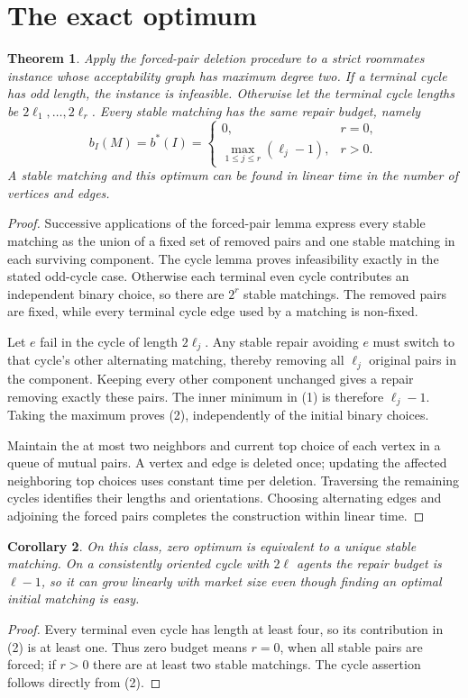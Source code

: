 \documentclass[11pt]{article}
\newtheorem{theorem}{Theorem}
\newtheorem{corollary}[theorem]{Corollary}
\theoremstyle{definition}
\begin{document}
\section*{The exact optimum}
\begin{theorem}
Apply the forced-pair deletion procedure to a strict roommates instance
whose acceptability graph has maximum degree two. If a terminal cycle
has odd length, the instance is infeasible. Otherwise let the terminal
cycle lengths be $2\ell_1,\ldots,2\ell_r$. Every stable matching has
the same repair budget, namely
\[
 b_I(M)=b^*(I)=
 \begin{cases}
 0,&r=0,\\
 \max_{1\le j\le r}(\ell_j-1),&r>0.
 \end{cases}                                               \tag{2}
\]
A stable matching and this optimum can be found in linear time in the
number of vertices and edges.
\end{theorem}
\begin{proof}
Successive applications of the forced-pair lemma express every stable
matching as the union of a fixed set of removed pairs and one stable
matching in each surviving component. The cycle lemma proves infeasibility
exactly in the stated odd-cycle case. Otherwise each terminal even cycle
contributes an independent binary choice, so there are $2^r$ stable
matchings. The removed pairs are fixed, while every terminal cycle edge
used by a matching is non-fixed.

Let $e$ fail in the cycle of length $2\ell_j$. Any stable repair avoiding
$e$ must switch to that cycle's other alternating matching, thereby
removing all $\ell_j$ original pairs in the component. Keeping every other
component unchanged gives a repair removing exactly these pairs. The
inner minimum in (1) is therefore $\ell_j-1$. Taking the maximum proves
(2), independently of the initial binary choices.

Maintain the at most two neighbors and current top choice of each vertex
in a queue of mutual pairs. A vertex and edge is deleted once; updating
the affected neighboring top choices uses constant time per deletion.
Traversing the remaining cycles identifies their lengths and orientations.
Choosing alternating edges and adjoining the forced pairs completes the
construction within linear time.
\end{proof}

\begin{corollary}
On this class, zero optimum is equivalent to a unique stable matching.
On a consistently oriented cycle with $2\ell$ agents the repair budget
is $\ell-1$, so it can grow linearly with market size even though finding
an optimal initial matching is easy.
\end{corollary}
\begin{proof}
Every terminal even cycle has length at least four, so its contribution
in (2) is at least one. Thus zero budget means $r=0$, when all stable
pairs are forced; if $r>0$ there are at least two stable matchings.
The cycle assertion follows directly from (2).
\end{proof}
\end{document}
